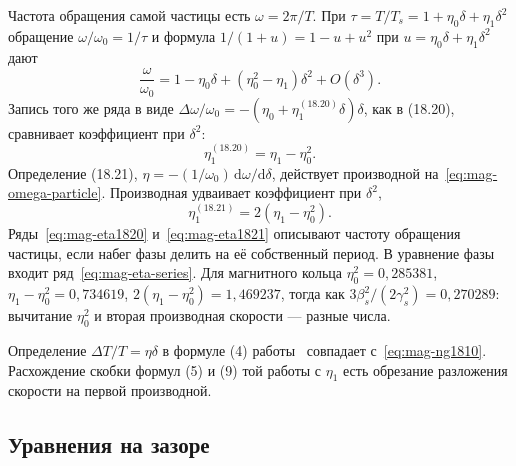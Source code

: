 Частота обращения самой частицы есть $\omega=2\pi/T$. При $\tau=T/T_s=1+\eta_0\delta+\eta_1\delta^2$ обращение $\omega/\omega_0=1/\tau$ и формула $1/(1+u)=1-u+u^2$ при $u=\eta_0\delta+\eta_1\delta^2$ дают
\begin{equation}
\label{eq:mag-omega-particle}
\frac{\omega}{\omega_0}
=1-\eta_0\delta+(\eta_0^2-\eta_1)\delta^2+O(\delta^3).
\end{equation}
Запись того же ряда в виде $\Delta\omega/\omega_0=-(\eta_0+\eta_1^{(18.20)}\delta)\delta$, как в (18.20), сравнивает коэффициент при $\delta^2$:
\begin{equation}
\label{eq:mag-eta1820}
\eta_1^{(18.20)}=\eta_1-\eta_0^2.
\end{equation}
Определение (18.21), $\eta=-(1/\omega_0)\,\mathrm{d}\omega/\mathrm{d}\delta$, действует производной на~\eqref{eq:mag-omega-particle}. Производная удваивает коэффициент при $\delta^2$,
\begin{equation}
\label{eq:mag-eta1821}
\eta_1^{(18.21)}=2(\eta_1-\eta_0^2).
\end{equation}
Ряды~\eqref{eq:mag-eta1820} и~\eqref{eq:mag-eta1821} описывают частоту обращения частицы, если набег фазы делить на её собственный период. В уравнение фазы входит ряд~\eqref{eq:mag-eta-series}. Для магнитного кольца $\eta_0^2=0{,}285381$, $\eta_1-\eta_0^2=0{,}734619$, $2(\eta_1-\eta_0^2)=1{,}469237$, тогда как $3\beta_s^2/(2\gamma_s^2)=0{,}270289$: вычитание $\eta_0^2$ и вторая производная скорости --- разные числа.

Определение $\Delta T/T=\eta\delta$ в формуле (4) работы~\cite{Senichev2013} совпадает с~\eqref{eq:mag-ng1810}. Расхождение скобки формул (5) и (9) той работы с $\eta_1$ есть обрезание разложения скорости на первой производной.

\subsection{Уравнения на зазоре}
\label{sec:gap}

